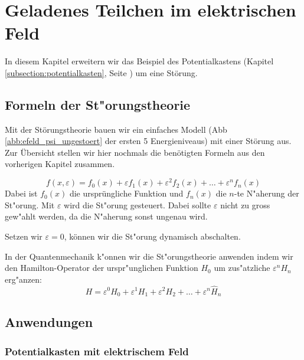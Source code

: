 \chapter{Geladenes Teilchen im elektrischen Feld\label{chapter:efeld}}
\begin{refsection}


In diesem Kapitel erweitern wir das Beispiel des Potentialkastens 
(Kapitel \ref{subsection:potentialkasten}, Seite \pageref{subsection:potentialkasten})
um eine St\"orung.

\section{Formeln der St"orungstheorie}
Mit der St\"orungstheorie bauen wir ein einfaches Modell
(Abb \ref{abb:efeld_psi_ungestoert} der ersten 5 Energieniveaus) 
mit einer St\"orung aus. 
Zur \"Ubersicht stellen wir hier nochmals die ben\"otigten Formeln aus den vorherigen Kapitel zusammen.

\[
  f(x, \varepsilon) = f_0(x) + \varepsilon f_1(x) + \varepsilon^2 f_2(x) + \ldots + \varepsilon^n f_n(x)
\]
Dabei ist $f_0(x)$ die urspr\"ungliche Funktion und $f_n(x)$ die $n$-te  N"aherung der St"orung.
Mit $\varepsilon$ wird die St"orung gesteuert. Dabei sollte $\varepsilon$ nicht zu gross gew"ahlt werden, 
da die N"aherung sonst ungenau wird. 

Setzen wir $\varepsilon = 0$, k\"onnen wir die St"orung dynamisch abschalten.

In der Quantenmechanik k"onnen wir die St"orungstheorie anwenden indem wir den Hamilton-Operator der 
urspr"unglichen Funktion $H_0$ um zus"atzliche $\varepsilon^n H_n$ erg"anzen:
\[
  H = \varepsilon^0 H_0 + \varepsilon^1 H_1 + \varepsilon^2 H_2 + \ldots + \varepsilon^n \hat H_n
\]












\section{Anwendungen}

\subsection{Potentialkasten mit elektrischem Feld}


\end{refsection}

